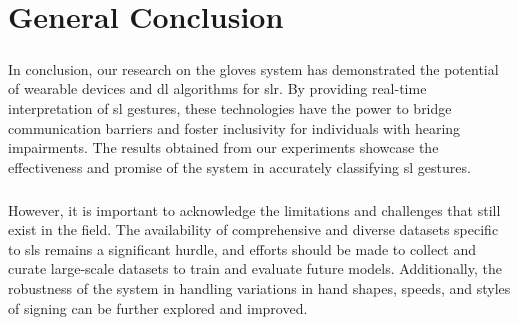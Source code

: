 \chapter*{General Conclusion}
\paragraph{}
In conclusion, our research on the gloves system has demonstrated the potential of wearable devices and \ac{dl} algorithms for \ac{slr}. By providing real-time interpretation of \ac{sl} gestures, these technologies have the power to bridge communication barriers and foster inclusivity for individuals with hearing impairments. The results obtained from our experiments showcase the effectiveness and promise of the system in accurately classifying \ac{sl} gestures.
\paragraph{}
However, it is important to acknowledge the limitations and challenges that still exist in the field. The availability of comprehensive and diverse datasets specific to \ac{sl}s remains a significant hurdle, and efforts should be made to collect and curate large-scale datasets to train and evaluate future models. Additionally, the robustness of the system in handling variations in hand shapes, speeds, and styles of signing can be further explored and improved.